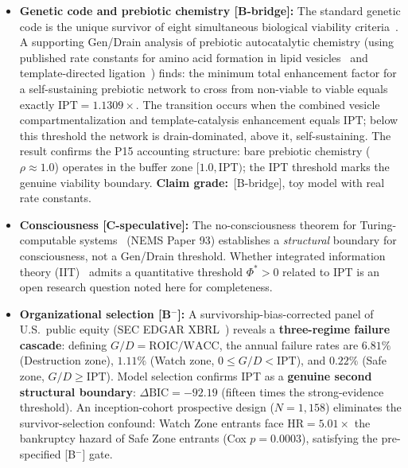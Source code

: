 \documentclass[11pt,twocolumn]{article}
\theoremstyle{remark}
\begin{document}
\begin{itemize}[leftmargin=1.5em,itemsep=0.1em]
  \textbf{Claim grade:}~[B-bridge], $1.6\%$ match. The N=50 normalization is physically motivated but not axiomatically derived from GTE.

  \item \textbf{Genetic code and prebiotic chemistry [B-bridge]:} The standard genetic code is the unique survivor of eight simultaneous biological viability criteria~\cite{SpivackGeneticCode}. A supporting Gen/Drain analysis of prebiotic autocatalytic chemistry (using published rate constants for amino acid formation in lipid vesicles~\cite{Rode1999} and template-directed ligation~\cite{Orgel1992}) finds:
  the minimum total enhancement factor for a self-sustaining prebiotic network to cross from non-viable to viable equals exactly $\mathrm{IPT} = 1.1309\times$. The transition occurs when the combined vesicle compartmentalization and template-catalysis enhancement equals $\mathrm{IPT}$; below this threshold the network is drain-dominated, above it, self-sustaining. The result confirms the P15 accounting structure: bare prebiotic chemistry ($\rho \approx 1.0$) operates in the buffer zone $[1.0, \mathrm{IPT})$; the IPT threshold marks the genuine viability boundary. \textbf{Claim grade:}~[B-bridge], toy model with real rate constants.

  \item \textbf{Consciousness [C-speculative]:} The no-consciousness theorem for Turing-computable systems~\cite{SpivackNEMSHub} (NEMS Paper 93) establishes a \emph{structural} boundary for consciousness, not a Gen/Drain threshold. Whether integrated information theory (IIT)~\cite{Tononi2008} admits a quantitative threshold $\Phi^* > 0$ related to IPT is an open research question noted here for completeness.

  \item \textbf{Organizational selection [B$^-$]:}
  A survivorship-bias-corrected panel of U.S.\ public equity (SEC EDGAR XBRL~\cite{SECEDGAR})
  reveals a \textbf{three-regime failure cascade}:
  defining $G/D = \mathrm{ROIC}/\mathrm{WACC}$, the annual failure rates are
  $6.81\%$ (Destruction zone), $1.11\%$ (Watch zone, $0 \leq G/D < \mathrm{IPT}$),
  and $0.22\%$ (Safe zone, $G/D \geq \mathrm{IPT}$).
  Model selection confirms IPT as a \textbf{genuine second structural boundary}:
  $\Delta\mathrm{BIC} = -92.19$ (fifteen times the strong-evidence threshold).
  An inception-cohort prospective design ($N = 1{,}158$) eliminates the survivor-selection
  confound: Watch Zone entrants face $\mathrm{HR} = 5.01\times$ the bankruptcy hazard of
  Safe Zone entrants (Cox $p = 0.0003$), satisfying the pre-specified [B$^-$] gate.


\end{itemize}
\end{document}
